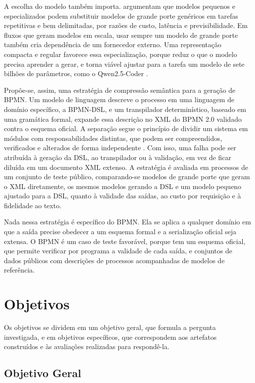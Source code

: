 A escolha do modelo também importa.  argumentam que modelos pequenos e especializados podem substituir modelos de grande porte genéricos em tarefas repetitivas e bem delimitadas, por razões de custo, latência e previsibilidade. Em fluxos que geram modelos em escala, usar sempre um modelo de grande porte também cria dependência de um fornecedor externo. Uma representação compacta e regular favorece essa especialização, porque reduz o que o modelo precisa aprender a gerar, e torna viável ajustar para a tarefa um modelo de sete bilhões de parâmetros, como o Qwen2.5-Coder \cite{hui2024qwen25coder}.

Propõe-se, assim, uma estratégia de compressão semântica para a geração de BPMN. Um modelo de linguagem descreve o processo em uma linguagem de domínio específico, a BPMN-DSL, e um transpilador determinístico, baseado em uma gramática formal, expande essa descrição no XML do BPMN 2.0 validado contra o esquema oficial. A separação segue o princípio de dividir um sistema em módulos com responsabilidades distintas, que podem ser compreendidos, verificados e alterados de forma independente \cite{parnas1972criteria}. Com isso, uma falha pode ser atribuída à geração da DSL, ao transpilador ou à validação, em vez de ficar diluída em um documento XML extenso. A estratégia é avaliada em processos de um conjunto de teste público, comparando-se modelos de grande porte que geram o XML diretamente, os mesmos modelos gerando a DSL e um modelo pequeno ajustado para a DSL, quanto à validade das saídas, ao custo por requisição e à fidelidade ao texto.

Nada nessa estratégia é específico do BPMN. Ela se aplica a qualquer domínio em que a saída precise obedecer a um esquema formal e a serialização oficial seja extensa. O BPMN é um caso de teste favorável, porque tem um esquema oficial, que permite verificar por programa a validade de cada saída, e conjuntos de dados públicos com descrições de processos acompanhadas de modelos de referência.

\section{Objetivos}
\label{sec:objetivos}

Os objetivos se dividem em um objetivo geral, que formula a pergunta investigada, e em objetivos específicos, que correspondem aos artefatos construídos e às avaliações realizadas para respondê-la.

\subsection{Objetivo Geral}
\label{sec:objetivo-geral}

